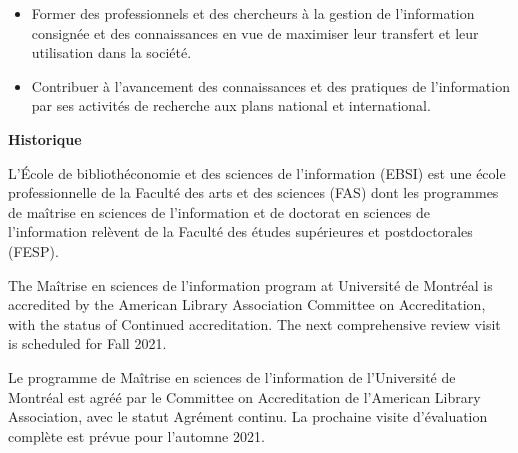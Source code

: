 \documentclass [12 pt]{article}
\begin{document}
        \begin{itemize}
        
                
        \item Former des professionnels et des chercheurs à la gestion de l'information
                    consignée et des connaissances en vue de maximiser leur transfert et leur
                    utilisation dans la société.
                
        \item Contribuer à l'avancement des connaissances et des pratiques de l'information
                    par ses activités de recherche aux plans national et international.
            
        \end{itemize}
    
            
        \textbf{
        Historique
        }
    
            L'École de bibliothéconomie et des sciences de l'information (EBSI) est une école
                professionnelle de la Faculté des arts et des sciences (FAS) dont les programmes de
                maîtrise en sciences de l'information et de doctorat en sciences de l'information
                relèvent de la Faculté des études supérieures et postdoctorales (FESP).
            
                
                    
                        
                            
                        
                        
                    
                
                
                    The Maîtrise en sciences de l'information
                        program at Université de Montréal is accredited by the American Library
                        Association Committee on Accreditation, with the status of Continued
                            accreditation. The next comprehensive review visit is scheduled
                        for Fall 2021.
                
                Le programme de Maîtrise en sciences de l'information
                    de l'Université de Montréal est agréé par le Committee on Accreditation de
                    l'American Library Association, avec le statut Agrément
                    continu. La prochaine visite d'évaluation complète est prévue pour
                    l'automne 2021.
            
\end{document}
